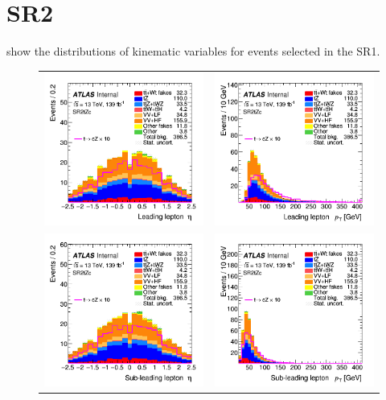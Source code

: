 \clearpage
\FloatBarrier
\newpage
\section{SR2\tZc}
\label{app:SRs:SR2}
 show the distributions 
of kinematic variables for events selected in the SR1\tZc.

\begin{figure}[!htbp]
	\centering
	\begin{tabular}{cc}
		\includegraphics[width=.35\textwidth]{Appendices/AP6/figures/SR2/lep1_eta} &
		\includegraphics[width=.35\textwidth]{Appendices/AP6/figures/SR2/lep1_pt} \\
		\includegraphics[width=.35\textwidth]{Appendices/AP6/figures/SR2/lep2_eta} &
		\includegraphics[width=.35\textwidth]{Appendices/AP6/figures/SR2/lep2_pt} \\

\end{tabular}
\end{figure}
